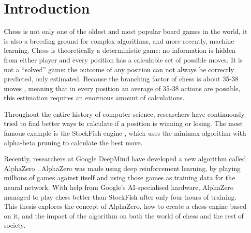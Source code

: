 \documentclass{article}
\begin{document}

\newpage
\setcounter{section}{0}
\section{Introduction}


Chess is not only one of the oldest and most popular board games in the world, it is also a breeding ground for
complex algorithms, and more recently, machine learning. Chess is theoretically a deterministic game: 
no information is hidden from either player and every position has a calculable set of possible moves.
It is not a ``solved'' game: the outcome of any position can not always be correctly predicted, only estimated. 
Because the branching factor of chess is about 35-38 moves \cite{BranchingFactorChessprogramming}, 
meaning that in every position an average of 35-38 actions are possible, 
this estimation requires an enormous amount of calculations.

Throughout the entire history of computer science, researchers have continuously tried to find better
ways to calculate if a position is winning or losing. The most famous example is the StockFish 
engine \cite{StockfishChess2022}, which uses the minimax algorithm with alpha-beta pruning to calculate the best move.

Recently, researchers at Google DeepMind have developed a new algorithm called AlphaZero \cite{AlphaZero2022}.
AlphaZero was made using deep reinforcement learning, by playing millions of games against itself and 
using those games as training data for the neural network. With help from Google's AI-specialised hardware,
AlphaZero managed to play chess better than StockFish after only four hours of training.
This thesis explores the concept of AlphaZero, how to create a chess engine based on it, and the impact of 
the algorithm on both the world of chess and the rest of society.
\end{document}
